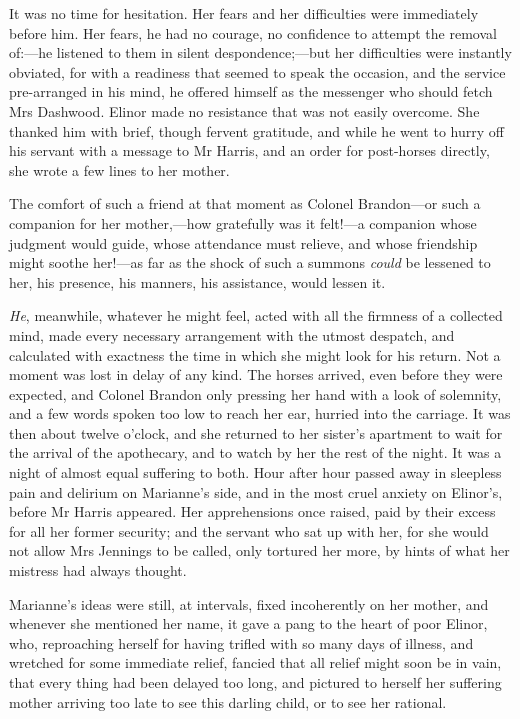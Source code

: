 It was no time for hesitation. Her fears and her difficulties were immediately before him. Her fears, he had no courage, no confidence to attempt the removal of:—he listened to them in silent despondence;—but her difficulties were instantly obviated, for with a readiness that seemed to speak the occasion, and the service pre-arranged in his mind, he offered himself as the messenger who should fetch Mrs Dashwood. Elinor made no resistance that was not easily overcome. She thanked him with brief, though fervent gratitude, and while he went to hurry off his servant with a message to Mr Harris, and an order for post-horses directly, she wrote a few lines to her mother.

The comfort of such a friend at that moment as Colonel Brandon—or such a companion for her mother,—how gratefully was it felt!—a companion whose judgment would guide, whose attendance must relieve, and whose friendship might soothe her!—as far as the shock of such a summons \textit{could} be lessened to her, his presence, his manners, his assistance, would lessen it.

\textit{He}, meanwhile, whatever he might feel, acted with all the firmness of a collected mind, made every necessary arrangement with the utmost despatch, and calculated with exactness the time in which she might look for his return. Not a moment was lost in delay of any kind. The horses arrived, even before they were expected, and Colonel Brandon only pressing her hand with a look of solemnity, and a few words spoken too low to reach her ear, hurried into the carriage. It was then about twelve o'clock, and she returned to her sister's apartment to wait for the arrival of the apothecary, and to watch by her the rest of the night. It was a night of almost equal suffering to both. Hour after hour passed away in sleepless pain and delirium on Marianne's side, and in the most cruel anxiety on Elinor's, before Mr Harris appeared. Her apprehensions once raised, paid by their excess for all her former security; and the servant who sat up with her, for she would not allow Mrs Jennings to be called, only tortured her more, by hints of what her mistress had always thought.

Marianne's ideas were still, at intervals, fixed incoherently on her mother, and whenever she mentioned her name, it gave a pang to the heart of poor Elinor, who, reproaching herself for having trifled with so many days of illness, and wretched for some immediate relief, fancied that all relief might soon be in vain, that every thing had been delayed too long, and pictured to herself her suffering mother arriving too late to see this darling child, or to see her rational.

